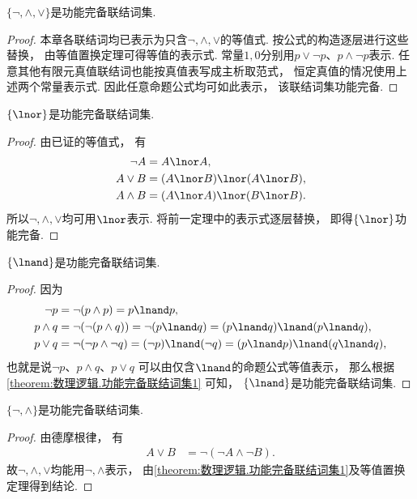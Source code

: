 \begin{theorem}\label{theorem:数理逻辑.功能完备联结词集1}
\(\{\neg,\land,\lor\}\)是功能完备联结词集.
    \begin{proof}
        本章各联结词均已表示为只含\(\neg,\land,\lor\)的等值式.
        按公式的构造逐层进行这些替换，
        由等值置换定理可得等值的表示式.
        常量\(1,0\)分别用\(p\lor\neg p\)、\(p\land\neg p\)表示.
        任意其他有限元真值联结词也能按真值表写成主析取范式，
        恒定真值的情况使用上述两个常量表示式.
        因此任意命题公式均可如此表示，
        该联结词集功能完备.
    \end{proof}
\end{theorem}
\begin{corollary}
\(\{\lnor\}\)是功能完备联结词集.
    \begin{proof}
        由已证的等值式，
        有
        \begin{align*}
            \neg A &= A\lnor A, \\
            A\lor B &= (A\lnor B)\lnor(A\lnor B), \\
            A\land B &= (A\lnor A)\lnor(B\lnor B).
        \end{align*}
        所以\(\neg,\land,\lor\)均可用\(\lnor\)表示.
        将前一定理中的表示式逐层替换，
        即得\(\{\lnor\}\)功能完备.
    \end{proof}
\end{corollary}
\begin{corollary}
\(\{\lnand\}\)是功能完备联结词集.
\begin{proof}
因为\begin{align*}
	\neg p
	&= \neg(p \land p)
	= p \lnand p, \\
	p \land q
	&= \neg(\neg(p \land q))
	= \neg(p \lnand q)
	= (p \lnand q) \lnand (p \lnand q), \\
	p \lor q
	&= \neg(\neg p \land \neg q)
	= (\neg p) \lnand (\neg q)
	= (p \lnand p) \lnand (q \lnand q),
\end{align*}
也就是说\(\neg p\)、\(p \land q\)、\(p \lor q\)
可以由仅含\(\lnand\)的命题公式等值表示，
那么根据\cref{theorem:数理逻辑.功能完备联结词集1} 可知，
\(\{\lnand\}\)是功能完备联结词集.
\end{proof}
\end{corollary}
\begin{corollary}
\(\{\neg,\land\}\)是功能完备联结词集.
    \begin{proof}
        由德摩根律，
        有
        \begin{align*}
            A\lor B &= \neg(\neg A\land\neg B).
        \end{align*}
        故\(\neg,\land,\lor\)均能用\(\neg,\land\)表示，
        由\cref{theorem:数理逻辑.功能完备联结词集1}及等值置换定理得到结论.
    \end{proof}
\end{corollary}
